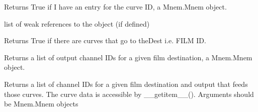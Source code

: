 \documentclass[letterpaper,10pt,english]{sphinxmanual}
\begin{document}
\begin{fulllineitems}

\begin{fulllineitems}
\label{\detokenize{ref/util/plot/PRESCfg:TotalDepth.util.plot.PRESCfg.PresCfg.__contains__}}
Returns True if I have an entry for the curve ID, a Mnem.Mnem object.

\end{fulllineitems}


\begin{fulllineitems}
\label{\detokenize{ref/util/plot/PRESCfg:TotalDepth.util.plot.PRESCfg.PresCfg.__weakref__}}
list of weak references to the object (if defined)

\end{fulllineitems}


\begin{fulllineitems}
\label{\detokenize{ref/util/plot/PRESCfg:TotalDepth.util.plot.PRESCfg.PresCfg.hasCurvesForDest}}
Returns True if there are curves that go to theDest i.e. FILM ID.

\end{fulllineitems}


\begin{fulllineitems}
\label{\detokenize{ref/util/plot/PRESCfg:TotalDepth.util.plot.PRESCfg.PresCfg.outpChIDs}}
Returns a list of output channel IDs for a given film destination, a Mnem.Mnem object.

\end{fulllineitems}


\begin{fulllineitems}
\label{\detokenize{ref/util/plot/PRESCfg:TotalDepth.util.plot.PRESCfg.PresCfg.outpCurveIDs}}
Returns a list of channel IDs for a given film destination and output
that feeds those curves. The curve data is accessible by \_\_getitem\_\_().
Arguments should be Mnem.Mnem objects


\end{fulllineitems}
\end{fulllineitems}
\end{document}
